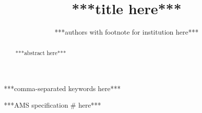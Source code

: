 \documentclass[review,leqno,onefignum,onetabnum]{siamart171218}
\title{***title here***}
\author{***authors with footnote for institution here***} %
\begin{document}
\maketitle

\renewcommand{\thefootnote}{\fnsymbol{footnote}}
\renewcommand{\thefootnote}{\arabic{footnote}}


\begin{abstract}
    ***abstract here***
\end{abstract}

\begin{keywords}
    ***comma-separated keywords here***
\end{keywords}

\begin{AMS}
    ***AMS specification \# here***
\end{AMS}


% 
\end{document}
